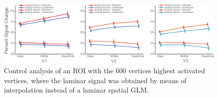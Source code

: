 \begin{figure}[!ht]
\centering
\includegraphics[width=1.0\textwidth, clip=true]{./Chapters/04_Attention/Images/SM_LayerResults_interpolation}
\caption{Control analysis of an ROI with the 600 vertices highest activated vertices, where the laminar signal was obtained by means of interpolation instead of a laminar spatial GLM.}
\label{fig:layerresultsinterp}
\end{figure}